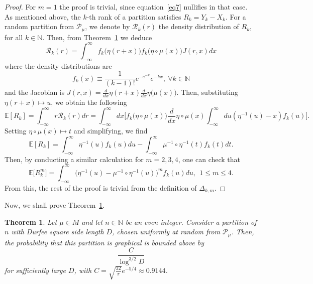 \documentclass[pdflatex,sn-mathphys-num]{sn-jnl}%
\newtheorem{theorem}{Theorem}[section] %
\theoremstyle{thmstyleone}%
\theoremstyle{thmstyletwo}%
\theoremstyle{thmstylethree}%
\theoremstyle{thmstylethree}%
\theoremstyle{thmstylethree}%
\begin{document}
\begin{proof}
    For $m=1$ the proof is trivial, since equation~\eqref{eq7} nullifies in that case. \\
    As mentioned above, the $k$-th rank of a partition satisfies $R_k=Y_k-X_k$. For a random partition from $\mathcal{P}_\mu$, we denote by $\mathcal{R}_k(r)$ the density distribution of $R_k$, for all $k\in\mathbb{N}$. Then, from Theorem~\ref{theo1} we deduce
    \begin{equation*}
    \mathcal{R}_k(r)=\int_{-\infty}^\infty f_k\big(\eta(r+x)\big)f_k\big(\eta\circ\mu(x)\big)J(r,x)dx
    \end{equation*}
    where the density distributions are
    \begin{equation*}
        f_k(x)\equiv\frac{1}{(k-1)!}e^{-e^{-x}}e^{-kx}, \ \forall k\in\mathbb{N}
    \end{equation*}
    and the Jacobian is $J(r,x)=\frac{d}{dx}\eta(r+x)\frac{d}{dx}\eta\big(\mu(x)\big)$. Then, substituting $\eta(r+x)\mapsto u$, we obtain the following
    \begin{equation*}
        \mathbb{E}[R_k]=\int_{-\infty}^\infty r\mathcal{R}_k(r)dr = \int_{-\infty}^\infty dx\Bigg[f_k\big(\eta\circ\mu(x)\big)\frac{d}{dx}\eta\circ\mu(x)\int_{-\infty}^\infty du(\eta^{-1}(u)-x)f_k(u)\Bigg].
    \end{equation*}
    Setting $\eta\circ\mu(x)\mapsto t$ and simplifying, we find
    \begin{equation*}
        \mathbb{E}[R_k]=\int_{-\infty}^\infty\eta^{-1}(u)f_k(u)du-\int_{-\infty}^\infty\mu^{-1}\circ\eta^{-1}(t)f_k(t)dt.
    \end{equation*}
    Then, by conducting a similar calculation for $m=2,3,4$, one can check that
    \begin{equation}\label{eq10}
        \mathbb{E}\big[R_k^m\big]=\int_{-\infty}^\infty\Big(\eta^{-1}(u)-\mu^{-1}\circ\eta^{-1}(u)\Big)^mf_k(u)du , \ \ 1\le m\le4.
    \end{equation}
    From this, the rest of the proof is trivial from the definition of $\Delta_{k,m}$.
\end{proof}
Now, we shall prove Theorem~\ref{theo1}.
\begin{theorem}\label{theo1}
    Let $\mu\in M$ and let $n\in\mathbb{N}$ be an even integer. Consider a partition of $n$ with Durfee square side length $D$, chosen uniformly at random from $\mathcal{P}_\mu$. Then, the probability that this partition is graphical is bounded above by
    \begin{equation}
        \frac{C}{\log^{3/2}D}
    \end{equation}
    for sufficiently large $D$, with $C=\sqrt{\frac{32}{\pi}}e^{-5/4}\approx 0.9144$.
\end{theorem}
\end{document}
